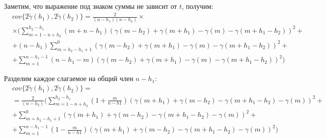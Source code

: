 Заметим, что выражение под знаком суммы не зависит от $t$, получим:
\begin{eqnarray*}
\nonumber
	& cov\{ 2 \tilde{\gamma}(h_1), 2 \tilde{\gamma}(h_2) \} = \frac{2}{(n - h_1) (n - h_2)} \times \\
	& \times (\sum_{m = 1 - n + h_2}^{h_2 - h_1}(m + n - h_1)(\gamma(m - h_2) + \gamma(m + h_1) - \gamma(m) - \gamma(m + h_1 - h_2))^2 + \\
	& + (n - h_1)\sum_{m = h_2 - h_1 + 1}^{0}(\gamma(m - h_2) + \gamma(m + h_1) - \gamma(m) - \gamma(m + h_1 - h_2))^2 + \\
	& + \sum_{m = 1}^{n - h_1 - 1}(n - h_1 - m)(\gamma(m - h_2) + \gamma(m + h_1) - \gamma(m) - \gamma(m + h_1 - h_2))^2)
\end{eqnarray*}

Разделим каждое слагаемое на общий член $n - h_1$:
\begin{eqnarray*}
\nonumber
	& cov\{ 2 \tilde{\gamma}(h_1), 2 \tilde{\gamma}(h_2) \} = \\
	& = \frac{2}{(n - h_2)} (\sum_{m = 1 - n + h_2}^{h_2 - h_1}(1 + \frac{m}{n - h1})(\gamma(m + h_1) + \gamma(m - h_2) - \gamma(m + h_1 - h_2) - \gamma(m))^2 + \\
	& + \sum_{m = h_2 - h_1 + 1}^{0}(\gamma(m + h_1) + \gamma(m - h_2) - \gamma(m + h_1 - h_2) - \gamma(m))^2 + \\
	& + \sum_{m = 1}^{n - h_1 - 1}(1 - \frac{m}{n - h1})(\gamma(m + h_1) + \gamma(m - h_2) - \gamma(m + h_1 - h_2) - \gamma(m))^2)
\end{eqnarray*}

